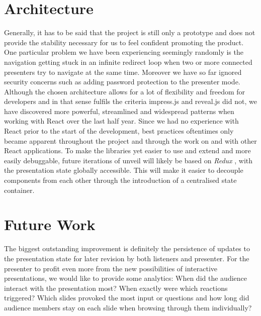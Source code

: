 \section{Architecture}
\label{sec:discussion-architecture}

Generally, it has to be said that the project is still only a prototype and does not provide the stability necessary for us to feel confident promoting the product. One particular problem we have been experiencing seemingly randomly is the navigation getting stuck in an infinite redirect loop when two or more connected presenters try to navigate at the same time. Moreover we have so far ignored security concerns such as adding password protection to the presenter mode.
Although the chosen architecture allows for a lot of flexibility and freedom for developers and in that sense fulfils the criteria impress.js and reveal.js did not, we have discovered more powerful, streamlined and widespread patterns when working with React over the last half year. Since we had no experience with React prior to the start of the development, best practices oftentimes only became apparent throughout the project and through the work on and with other React applications. To make the libraries yet easier to use and extend and more easily debuggable, future iterations of unveil will likely be based on \emph{Redux} \cite{redux}, with the presentation state globally accessible. This will make it easier to decouple components from each other through the introduction of a centralised state container.

\section{Future Work}
\label{sec:discussion-future-work}

The biggest outstanding improvement is definitely the persistence of updates to the presentation state for later revision by both listeners and presenter. For the presenter to profit even more from the new possibilities of interactive presentations, we would like to provide some analytics: When did the audience interact with the presentation most? When exactly were which reactions triggered? Which slides provoked the most input or questions and how long did audience members stay on each slide when browsing through them individually?

